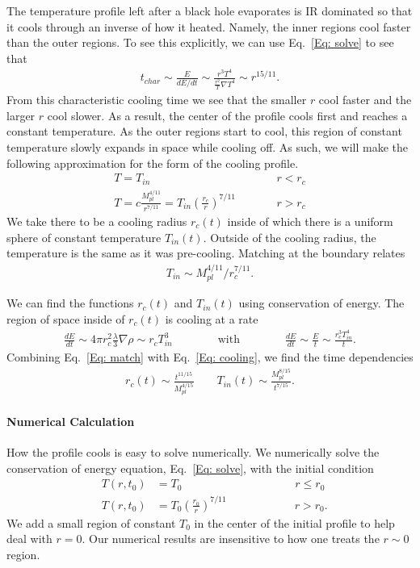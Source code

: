 \documentclass[superscriptaddress,groupedaddress,nofootnoteinbib,11pt]{article}
\newcommand\eea{\end{eqnarray}}
\newcommand\bea{\begin{eqnarray}}
\newcommand{\mpl}{M_{pl}}
\def\r{\right)}
\begin{document}
The temperature profile left after a black hole evaporates is IR dominated so that it cools through an inverse of how it heated.  Namely, the inner regions cool faster than the outer regions.  To see this explicitly, we can use Eq.~\ref{Eq: solve} to see that  
\bea
t_{char} \sim \frac{E}{dE/dt} \sim \frac{r^3 T^4}{\frac{r^2}{T} \nabla T^4} \sim r^{15/11}.
\eea
From this characteristic cooling time we see that the smaller $r$ cool faster and the larger $r$ cool slower.
As a result, the center of the profile cools first and reaches a constant temperature.  As the outer regions start to cool, this region of constant temperature slowly expands in space while cooling off.  
As such, we will make the following approximation for the form of the cooling profile.
\bea
 T = T_{in} \qquad \qquad \qquad &\qquad& r < r_c\\
 T =  c \frac{\mpl^{4/11}}{r^{7/11}} = T_{in} \left ( \frac{r_c}{r} \right )^{7/11} &\qquad& r > r_c
\eea
We take there to be a cooling radius $r_c(t)$ inside of which there is a uniform sphere of constant temperature $T_{in}(t)$.  Outside of the cooling radius, the temperature is the same as it was pre-cooling.  Matching at the boundary relates 
\bea
\label{Eq: match}
T_{in} \sim \mpl^{4/11}/r_c^{7/11}.
\eea


We can find the functions $r_c(t)$ and $T_{in}(t)$ using conservation of energy.  The region of space inside of $r_c(t)$ is cooling at a rate
\bea
\label{Eq: cooling}
\frac{dE}{dt} \sim 4 \pi r_c^2 \frac{\lambda}{3} \nabla \rho \sim r_c T_{in}^3 \qquad \qquad \text{with} \qquad \qquad \frac{dE}{dt} \sim \frac{E}{t} \sim \frac{r_c^3 T_{in}^4}{t}.
\eea
Combining Eq.~\ref{Eq: match} with Eq.~\ref{Eq: cooling}, we find the time dependencies 
\bea
r_c(t)\sim \frac{t^{11/15}}{\mpl^{4/15}} \qquad T_{in}(t) \sim \frac{\mpl^{8/15}}{t^{7/15}}.
\label{Eq: cool}
\eea

\paragraph{Numerical Calculation}
How the profile cools is easy to solve numerically.  We numerically solve the conservation of energy equation, Eq.~\ref{Eq: solve},
with the initial condition
\bea\label{eq:boundarycondition}
&T(r,t_0)& =T_0 \qquad \qquad \qquad \qquad \qquad  r \leq r_0 \\
&T(r,t_0)& = T_0 \left ( \frac{r_0}{r} \right )^{7/11} \qquad \qquad \qquad r > r_0.
\eea
We add a small region of constant $T_0$ in the center of the initial profile to help deal with $r = 0$.  Our numerical results are insensitive to how one treats the $r \sim 0$ region.
\end{document}
